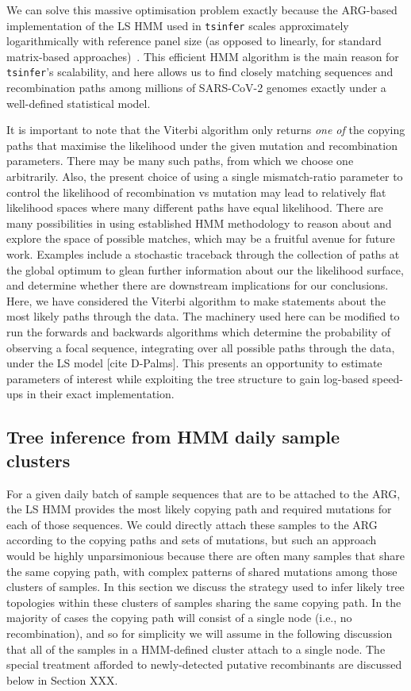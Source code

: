 \documentclass{article}
\begin{document}
We can solve this massive optimisation problem exactly because the ARG-based
implementation of the LS HMM used in \texttt{tsinfer} scales approximately
logarithmically with reference panel size (as opposed to linearly,
for standard matrix-based approaches)~\citep{Kelleher2019-ba}.
This efficient HMM algorithm is the main reason for \texttt{tsinfer}'s
scalability, and here allows us to find closely matching
sequences and recombination paths among millions of SARS-CoV-2
genomes exactly under a well-defined statistical model.

It is important to note that the Viterbi algorithm only returns \emph{one of}
the copying paths that maximise the likelihood under the given mutation and
recombination parameters. There may be many such paths, from which we choose
one arbitrarily. Also, the present choice of using a single mismatch-ratio
parameter to control the likelihood of recombination vs mutation may lead to
relatively flat likelihood spaces where many different paths have equal
likelihood. There are many possibilities in using established HMM methodology
to reason about and explore the space of possible matches, which may be a
fruitful avenue for future work. Examples include a stochastic traceback
through the collection of paths at the global optimum to glean further
information about our the likelihood surface, and determine whether there are
downstream implications for our conclusions. Here, we have considered the
Viterbi algorithm to make statements about the most likely paths through the
data. The machinery used here can be modified to run the forwards and backwards
algorithms which determine the probability of observing a focal sequence,
integrating over all possible paths through the data, under the LS model [cite
D-Palms]. This presents an opportunity to estimate parameters of interest while
exploiting the tree structure to gain log-based speed-ups in their exact
implementation.

\subsection{Tree inference from HMM daily sample clusters}
\label{sec:sample-cluster-tree-inference}
For a given daily batch of sample sequences that are to be attached to the
ARG, the LS HMM provides the most likely copying path and required mutations
for each of those sequences. We could directly attach these samples to
the ARG according to the copying paths and sets of mutations, but
such an approach would be highly unparsimonious because there are
often many samples that share the same copying path, with
complex patterns of shared mutations among those clusters of samples.
In this section we discuss the strategy used to infer likely tree
topologies within these clusters of samples sharing the same copying path.
In the majority of cases the copying path will consist of a single
node (i.e., no recombination), and so for simplicity we will assume in the
following discussion that all of the samples in a HMM-defined cluster
attach to a single node. The special treatment afforded to
newly-detected putative recombinants are discussed below
in Section XXX.
\end{document}
